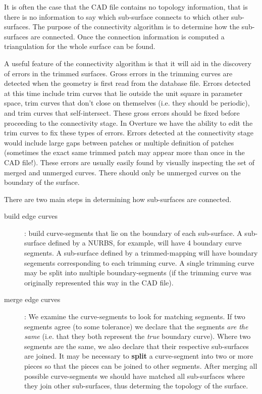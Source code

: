 \documentclass[11pt]{article}
\begin{document}
It is often the case that the CAD file contains no topology
information, that is there is no information to say which sub-surface
connects to which other sub-surfaces. The purpose of the connectivity
algorithm is to determine how the sub-surfaces are connected. Once the
connection information is computed a triangulation for the whole
surface can be found. 

A useful feature of the connectivity algorithm is that it will aid in
the discovery of errors in the trimmed surfaces.  Gross errors in the
trimming curves are detected when the geometry is first read from the
database file. Errors detected at this time include trim curves that
lie outside the unit square in parameter space, trim curves that don't
close on themselves (i.e. they should be periodic), and trim curves
that self-intersect. These gross errors should be fixed before
proceeding to the connectivity stage. In Overture we have the ability
to edit the trim curves to fix these types of errors.  Errors detected
at the connectivity stage would include large gaps between patches or
multiple definition of patches (sometimes the exact same trimmed patch
may appear more than once in the CAD file!). These errors are usually
easily found by visually inspecting the set of merged and unmerged
curves.  There should only be unmerged curves on the boundary of the
surface.

There are two main steps in determining how sub-surfaces are connected.
\begin{description}
   \item[build edge curves] : build curve-segments that lie on the boundary of each sub-surface. 
      A sub-surface defined by a NURBS, for example, will have 4 boundary curve segments.  A sub-surface
      defined by a trimmed-mapping will have boundary segements corresponding to each trimming curve.
      A single trimming curve may be split into multiple boundary-segments (if the trimming curve
      was originally represented this way in the CAD file).
   \item[merge edge curves] : We examine the curve-segments to look for matching segments. If two segments
     agree (to some tolerance) we declare that the segments {\it are the same} (i.e. that they both
      represent the {\it true} boundary curve). Where two segments are the same, we also declare that
      their respective sub-surfaces are joined. It may be necessary to {\bf split} a curve-segment
      into two or more pieces so that the pieces can be joined to other segments. After merging all possible
      curve-segments we should have matched all sub-surfaces where they join other sub-surfaces, thus
      determing the topology of the surface.
\end{description}
\end{document}
